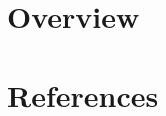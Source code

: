 \documentclass[aspectratio=169]{beamer}
\begin{document}
\section*{Overview}
\begin{frame}
  \tableofcontents %
\end{frame}




\section*{References}
\begin{frame}[allowframebreaks]
  \Large{
    
    
  }
  \end{frame}
\end{document}
